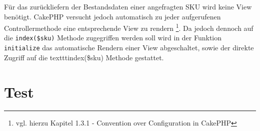 	Für das zurückliefern der Bestandsdaten einer angefragten SKU wird keine View benötigt. CakePHP versucht jedoch automatisch zu jeder aufgerufenen Controllermethode eine entsprechende View zu rendern \footnote{vgl. hierzu Kapitel 1.3.1 - Convention over Configuration in CakePHP}.  Da jedoch dennoch auf die \texttt{index(\$sku)} Methode zugegriffen werden soll wird in der Funktion \texttt{initialize} das automatische Rendern einer View abgeschaltet, sowie der direkte Zugriff auf die texttt{index(\$sku)} Methode gestattet.
	
	
	
	
	
	
	
	
	
	
	
	
	
	
	
	
	
	
	
	
	
	
	
	

	
	\section{Test}


	

